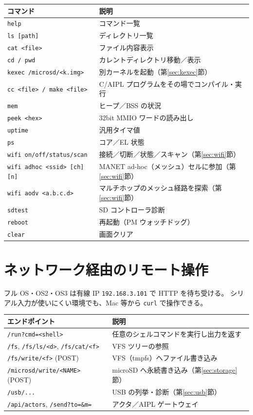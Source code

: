\documentclass[a4paper,11pt]{ltjsarticle}
\newcommand{\cmd}[1]{\texttt{#1}}
\begin{document}
\begin{longtable}{ll}
\hline
コマンド & 説明 \\
\hline
\cmd{help} & コマンド一覧 \\
\cmd{ls [path]} & ディレクトリ一覧 \\
\cmd{cat <file>} & ファイル内容表示 \\
\cmd{cd / pwd} & カレントディレクトリ移動／表示 \\
\cmd{kexec /microsd/<k.img>} & 別カーネルを起動（第\ref{sec:kexec}節）\\
\cmd{cc <file> / make <file>} & C/AIPL プログラムをその場でコンパイル・実行 \\
\cmd{mem} & ヒープ／BSS の状況 \\
\cmd{peek <hex>} & 32bit MMIO ワードの読み出し \\
\cmd{uptime} & 汎用タイマ値 \\
\cmd{ps} & コア／EL 状態 \\
\cmd{wifi on/off/status/scan} & 接続／切断／状態／スキャン（第\ref{sec:wifi}節）\\
\cmd{wifi adhoc <ssid> [ch] [n]} & MANET ad-hoc（メッシュ）セルに参加（第\ref{sec:wifi}節）\\
\cmd{wifi aodv <a.b.c.d>} & マルチホップのメッシュ経路を探索（第\ref{sec:wifi}節）\\
\cmd{sdtest} & SD コントローラ診断 \\
\cmd{reboot} & 再起動（PM ウォッチドッグ）\\
\cmd{clear} & 画面クリア \\
\hline
\end{longtable}

\section{ネットワーク経由のリモート操作}
\label{sec:remote}
フル OS・OS2・OS3 は有線 IP \texttt{192.168.3.101} で HTTP を待ち受ける。
シリアル入力が使いにくい環境でも、Mac 等から \texttt{curl} で操作できる。

\begin{longtable}{ll}
\hline
エンドポイント & 説明 \\
\hline
\cmd{/run?cmd=<shell>} & 任意のシェルコマンドを実行し出力を返す \\
\cmd{/fs}, \cmd{/fs/ls/<d>}, \cmd{/fs/cat/<f>} & VFS ツリーの参照 \\
\cmd{/fs/write/<f>} (POST) & VFS（tmpfs）へファイル書き込み \\
\cmd{/microsd/write/<NAME>} (POST) & microSD へ永続書き込み（第\ref{sec:storage}節）\\
\cmd{/usb/...} & USB の列挙・診断（第\ref{sec:usb}節）\\
\cmd{/api/actors}, \cmd{/send?to=\&m=} & アクタ／AIPL ゲートウェイ \\
\hline
\end{longtable}
\end{document}
